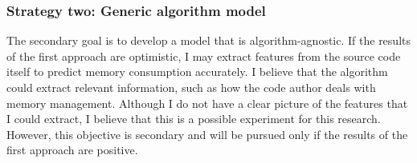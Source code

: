 \subsubsection{Strategy two: Generic algorithm model}
\label{subsubsec:generic-algorithm-model}

The secondary goal is to develop a model that is algorithm-agnostic.
If the results of the first approach are optimistic, I may extract features from the source code itself to predict memory consumption accurately.
I believe that the algorithm could extract relevant information, such as how the code author deals with memory management.
Although I do not have a clear picture of the features that I could extract, I believe that this is a possible experiment for this research.
However, this objective is secondary and will be pursued only if the results of the first approach are positive.

